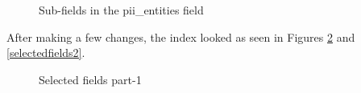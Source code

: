 \begin{itemize}
\begin{itemize}
        \begin {figure}[h!h]
            \centering
            \caption{Sub-fields in the pii\_entities field}
            \label{piisubfields}
        \end {figure}
        After making a few changes, the index looked as seen in Figures \ref{selectedfields1} and \ref{selectedfields2}.
        \begin {figure}[h!h]
            \centering
            \caption{Selected fields part-1}
            \label{selectedfields1}
        \end {figure}
        \begin {figure}[h!h]
            \centering

\end{figure}
\end{itemize}
\end{itemize}

